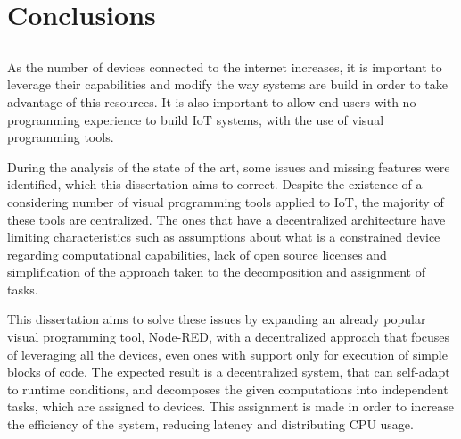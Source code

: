 \chapter{Conclusions} \label{chap:concl}

\section*{}

As the number of devices connected to the internet increases, it is important to leverage their capabilities and modify the way systems are build in order to take advantage of this resources. It is also important to allow end users with no programming experience to build IoT systems, with the use of visual programming tools. 

During the analysis of the state of the art, some issues and missing features were identified, which this dissertation aims to correct. Despite the existence of a considering number of visual programming tools applied to IoT, the majority of these tools are centralized. The ones that have a decentralized architecture have limiting characteristics such as assumptions about what is a constrained device regarding computational capabilities, lack of open source licenses and simplification of the approach taken to the decomposition and assignment of tasks.

This dissertation aims to solve these issues by expanding an already popular visual programming tool, Node-RED, with a decentralized approach that focuses of leveraging all the devices, even ones with support only for execution of simple blocks of code. The expected result is a decentralized system, that can self-adapt to runtime conditions, and decomposes the given computations into independent tasks, which are assigned to devices. This assignment is made in order to increase the efficiency of the system, reducing latency and distributing CPU usage.  





